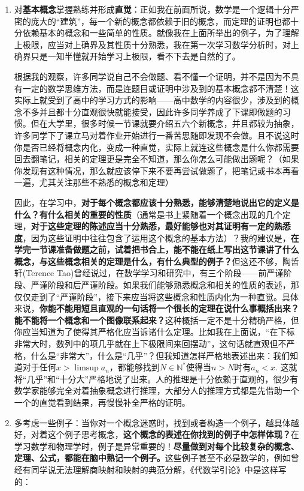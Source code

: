 \documentclass{ctexart}
\begin{document}
\begin{enumerate}[leftmargin=*, labelsep=0.5em]
\item 对\textbf{基本概念}掌握熟练并形成\textbf{直觉}：正如我在前面所说，数学是一个逻辑十分严密的庞大的“建筑”，每一个新的概念都依赖于旧的概念，而定理的证明也都十分依赖基本的概念和一些简单的性质。就像我在上面所举出的例子，为了理解上极限，应当对上确界及其性质十分熟悉，我在第一次学习数学分析时，对上确界只是一知半懂就开始学习上极限，看不下去是自然的了。

根据我的观察，许多同学说自己不会做题、看不懂一个证明，并不是因为不具有一定的数学思维方法，而是连题目或证明中涉及到的基本概念都不清楚！这实际上就受到了高中的学习方式的影响——高中数学的内容很少，涉及到的概念不多并且都十分直观很快就能接受，因此许多同学养成了下课即做题的习惯。但在大学里，很多时候一节课就要介绍五六个新概念，并且都较为抽象，许多同学下了课立马对着作业开始进行一番苦思随即发现不会做。且不说这时你是否已经将概念内化，变成一种直觉，实际上就连这些概念是什么你都需要回去翻笔记，相关的定理更是完全不知道，那么你怎么可能做出题呢？（如果你发现有这种情况，那么就应该停下来不要再尝试做题了，把笔记或书本再看一遍，尤其关注那些不熟悉的概念和定理）

因此，在学习中，\textbf{对于每个概念都应该十分熟悉，能够清楚地说出它的定义是什么？有什么相关的重要的性质}（通常是书上紧随着一个概念出现的几个定理，\textbf{对于这些定理的陈述应当十分熟悉，最好能够也对其证明有一定的熟悉度}，因为这些证明中往往包含了运用这个概念的基本方法）？我的建议是，\textbf{在学完一节课准备做题之前，试着把书合上，能不能在纸上写出这节课讲了什么概念，与这些概念相关的定理是什么，有什么典型的例子？}但这还不够，陶哲轩(Terence
Tao)曾经说过，在数学学习和研究中，有三个阶段——前严谨阶段、严谨阶段和后严谨阶段。如果我们能够熟悉概念和相关的性质的表述，那仅仅走到了“严谨阶段”，接下来应当将这些概念和性质内化为一种直觉。具体来说，\textbf{你能不能用短且直观的一句话将一个很长的定理在说什么事概括出来？能不能将一个概念和一个图像联系起来？}这种概括一定不是十分精确严格，但你应当知道为了使得其严格化应当诉诸什么定理。比如我在上面说，“在下标非常大时，数列中的项几乎就在上下极限间来回摆动”，这句话就直观但不严格，什么是“非常大”，什么是“几乎”？但我知道怎样严格地表述出来：我们知道对于任何$x > \limsup a_{n}$，都能够找到$N \in \mathbb{N}^{*}$使得当$n > N$时有$a_{n} < x$. 这就将“几乎”和“十分大”严格地说了出来。人的推理是十分依赖于直观的，很少有数学家能够完全对着抽象概念进行推理，大部分人的推理方式都是先借助一个一个的直觉看到结果，再慢慢补全严格的证明。

\item 多考虑一些例子：当你对一个概念迷惑时，找到或者构造一个例子，越具体越好，对着这个例子思考概念，\textbf{这个概念的表述在你找到的例子中怎样体现？}在学习数学和物理学时，例子是异常重要的！\textbf{尽量做到对每个比较复杂的概念、定理、公式，都能在脑中熟记一个例子。}这些例子甚至不必是数学的，例如曾经有同学说无法理解商映射和映射的典范分解，《代数学引论》中是这样写的：


\end{enumerate}
\end{document}
